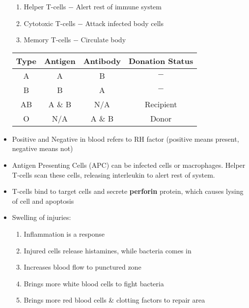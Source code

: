 \documentclass[12pt]{article}
\begin{document}
\begin{itemize}
\begin{enumerate}
     \item Helper T-cells $-$ Alert rest of immune system

     \item Cytotoxic T-cells $-$ Attack infected body cells

     \item Memory T-cells $-$ Circulate body

   \end{enumerate}

   \begin{center}
   \begin{tabular}[h]{|c|c|c|c|}
     \hline
     Type & Antigen & Antibody & Donation Status\\
     \hline
     A & A & B & $-$\\
     \hline
     B & B & A & $-$\\
     \hline
     AB & A \& B & N/A & Recipient\\
     \hline
     O & N/A & A \& B & Donor\\
     \hline
   \end{tabular}
 \end{center}

 \item Positive and Negative in blood refers to RH factor (positive means present, negative means not)

 \item Antigen Presenting Cells (APC) can be infected cells or macrophages. Helper T-cells scan these cells, releasing interleukin to alert rest of system.

 \item T-cells bind to target cells and secrete \textbf{perforin} protein, which causes lysing of cell and apoptosis

 \item Swelling of injuries:

   \begin{enumerate}

     \item Inflammation is a response

     \item Injured cells release histamines, while bacteria comes in
       
     \item Increases blood flow to punctured zone

     \item Brings more white blood cells to fight bacteria

     \item Brings more red blood cells \& clotting factors to repair area

   \end{enumerate}

\end{itemize}
\end{document}
